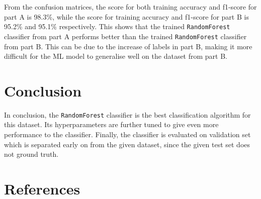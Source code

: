\documentclass[12pt]{article}
\begin{document}
        From the confusion matrices, the score for both training accuracy and f1-score for part A is 98.3\%, while the
        score for training accuracy and f1-score for part B is 95.2\% and 95.1\% respectively. This shows that the
        trained \verb|RandomForest| classifier from part A performs better than the trained \verb|RandomForest| 
        classifier from part B. This can be due to the increase of labels in part B, making it more difficult for the
        ML model to generalise well on the dataset from part B.

    \section{Conclusion}

        In conclusion, the \verb|RandomForest| classifier is the best classification algorithm for this dataset. Its
        hyperparameters are further tuned to give even more performance to the classifier. Finally, the classifier is
        evaluated on validation set which is separated early on from the given dataset, since the given test set does
        not ground truth.

    \newpage

    \section{References}
    \label{sec:references}
    
        \printbibliography[heading = none]
\end{document}
